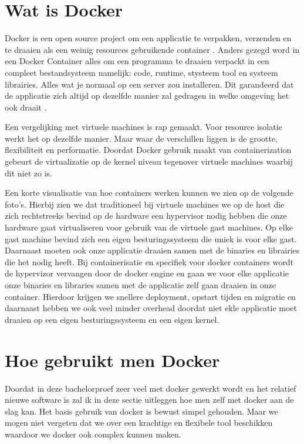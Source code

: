 \section{Wat is Docker}

Docker is een open source project om een applicatie te verpakken, verzenden en te draaien als een weinig resources gebruikende container \cite{Docker:TheContainerEngine2016}. Anders gezegd word in een Docker Container alles om een programma te draaien verpackt in een compleet bestandsysteem namelijk: code, runtime, stysteem tool en systeem librairies. Alles wat je normaal op een server zou installeren. Dit garandeerd dat de applicatie zich altijd op dezelfde manier zal gedragen in welke omgeving het ook draait \citep{WatIsDocker2016}.

Een vergelijking met virtuele machines is rap gemaakt. Voor resource isolatie werkt het op dezelfde manier. Maar waar de verschillen liggen is de grootte, flexibiliteit en performatie. Doordat Docker gebruik maakt van containerization gebeurt de virtualizatie op de kernel niveau tegenover virtuele machines waarbij dit niet zo is. 

Een korte visualisatie van hoe containers werken kunnen we zien op de volgende foto's. Hierbij zien we dat traditioneel bij virtuele machines we op de host die zich rechtstreeks bevind op de hardware een hypervisor nodig hebben die onze hardware gaat virtualiseren voor gebruik van de virtuele gast machines. Op elke gast machine bevind zich een eigen besturingssysteem die uniek is voor elke gast. Daarnaast moeten ook onze applicatie draaien samen met de binaries en librairies die het nodig heeft. Bij containerisatie en specifiek voor docker containers wordt de hypervizor vervangen door de docker engine en gaan we voor elke applicatie onze binaries en libraries samen met de applicatie zelf gaan draaien in onze container. Hierdoor krijgen we snellere deployment, opstart tijden en migratie en daarnaast hebben we ook veel minder overhead doordat niet ekle applicatie moet draaien op een eigen besturingssysteem en een eigen kernel. 

\section{Hoe gebruikt men Docker}

Doordat in deze bachelorproef zeer veel met docker gewerkt wordt en het relatief nieuwe software is zal ik in deze sectie uitleggen hoe men zelf met docker aan de slag kan. Het basis gebruik van docker is bewust simpel gehouden. Maar we mogen niet vergeten dat we over een krachtige en flexibele tool beschikken waardoor we docker ook complex kunnen maken.

